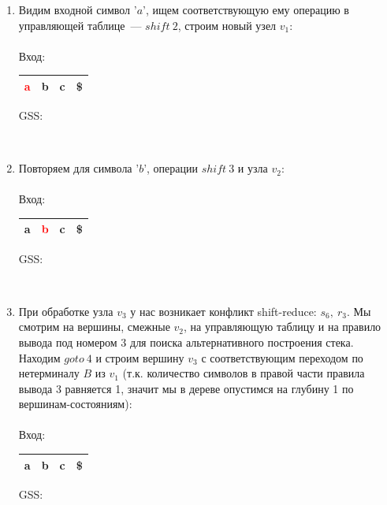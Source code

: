 \begin{example}
\begin{enumerate}
        \item Видим входной символ '$a$', ищем соответствующую ему операцию в управляющей таблице~--- $shift\ 2$, строим новый узел $v_1$: \\ \\
        Вход: \,
        \begin{tabular}[c]{ |c|c|c|c| }
            \hline \textcolor{red}{a} & b & c & \$ \\ \hline
        \end{tabular}
        \qquad GSS: \,
        
        \\

        \item Повторяем для символа '$b$', операции $shift\ 3$ и узла $v_2$: \\ \\
        Вход: \,
        \begin{tabular}[c]{ |c|c|c|c| }
            \hline a & \textcolor{red}{b} & c & \$ \\ \hline
        \end{tabular}
        \qquad GSS: \,
        
        \\

        \item При обработке узла $v_3$ у нас возникает конфликт shift-reduce: $s_6,\ r_3$. Мы смотрим на вершины, смежные $v_2$, на управляющую таблицу и на правило вывода под номером 3 для поиска альтернативного построения стека. Находим $goto\ 4$ и строим вершину $v_3$ с соответствующим переходом по нетерминалу $B$ из $v_1$ (т.к. количество символов в правой части правила вывода 3 равняется 1, значит мы в дереве опустимся на глубину 1 по вершинам-состояниям):\\ \\
        Вход: \,
        \begin{tabular}[c]{ |c|c|c|c| }
            \hline a & b & c & \$ \\ \hline
        \end{tabular}
        \qquad GSS: \,
        
        \\


\end{enumerate}
\end{example}
